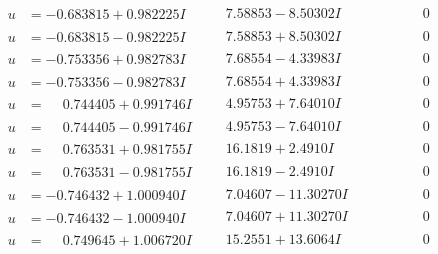 \documentclass[1p]{elsarticle_modified}
\theoremstyle{definition}
\begin{document}
$$\begin{array}{c|c|c}
\begin{aligned}
u &= -0.683815 + 0.982225 I\end{aligned}
 & \phantom{-}7.58853 - 8.50302 I & \phantom{-0.000000 } 0 \\ \hline\begin{aligned}
u &= -0.683815 - 0.982225 I\end{aligned}
 & \phantom{-}7.58853 + 8.50302 I & \phantom{-0.000000 } 0 \\ \hline\begin{aligned}
u &= -0.753356 + 0.982783 I\end{aligned}
 & \phantom{-}7.68554 - 4.33983 I & \phantom{-0.000000 } 0 \\ \hline\begin{aligned}
u &= -0.753356 - 0.982783 I\end{aligned}
 & \phantom{-}7.68554 + 4.33983 I & \phantom{-0.000000 } 0 \\ \hline\begin{aligned}
u &= \phantom{-}0.744405 + 0.991746 I\end{aligned}
 & \phantom{-}4.95753 + 7.64010 I & \phantom{-0.000000 } 0 \\ \hline\begin{aligned}
u &= \phantom{-}0.744405 - 0.991746 I\end{aligned}
 & \phantom{-}4.95753 - 7.64010 I & \phantom{-0.000000 } 0 \\ \hline\begin{aligned}
u &= \phantom{-}0.763531 + 0.981755 I\end{aligned}
 & \phantom{-}16.1819 + 2.4910 I & \phantom{-0.000000 } 0 \\ \hline\begin{aligned}
u &= \phantom{-}0.763531 - 0.981755 I\end{aligned}
 & \phantom{-}16.1819 - 2.4910 I & \phantom{-0.000000 } 0 \\ \hline\begin{aligned}
u &= -0.746432 + 1.000940 I\end{aligned}
 & \phantom{-}7.04607 - 11.30270 I & \phantom{-0.000000 } 0 \\ \hline\begin{aligned}
u &= -0.746432 - 1.000940 I\end{aligned}
 & \phantom{-}7.04607 + 11.30270 I & \phantom{-0.000000 } 0 \\ \hline\begin{aligned}
u &= \phantom{-}0.749645 + 1.006720 I\end{aligned}
 & \phantom{-}15.2551 + 13.6064 I & \phantom{-0.000000 } 0 \\ \hline\begin{aligned}

\end{aligned}
\end{array}$$
\end{document}
